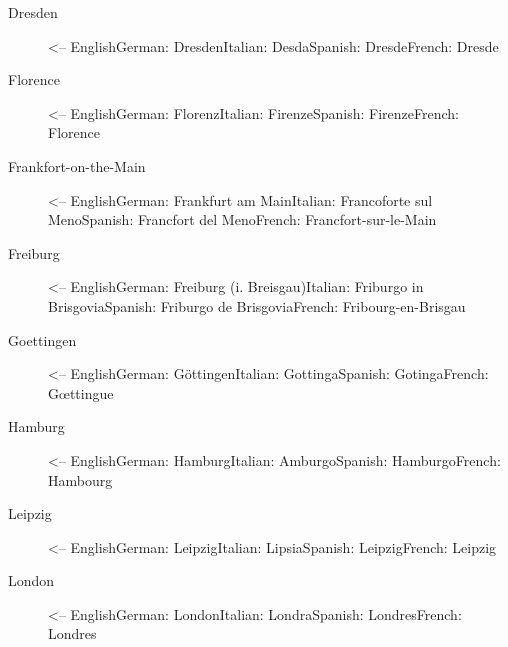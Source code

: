 \documentclass[a4paper,
10pt,
greek,
french,
spanish,
italian,
ngerman,
english
]{ltxdoc}
\begin{document}
\begin{multicols}{3}
\begin{description}
\item[Dresden] <-- English\newline German: Dresden\newline Italian: Desda\newline Spanish: Dresde\newline French: Dresde
\item[Florence] <-- English\newline German: Florenz\newline Italian: Firenze\newline Spanish: Firenze\newline French: Florence
\item[Frankfort-on-the-Main] <-- English\newline German: Frankfurt am Main\newline Italian: Francoforte sul Meno\newline Spanish: Francfort del Meno\newline French: Francfort-sur-le-Main
\item[Freiburg] <-- English\newline German: Freiburg (i. Breisgau)\newline Italian: Friburgo in Brisgovia\newline Spanish: Friburgo de Brisgovia\newline French: Fribourg-en-Brisgau
\item[Goettingen] <-- English\newline German: Göttingen\newline Italian: Gottinga\newline Spanish: Gotinga\newline French: Gœttingue
\item[Hamburg] <-- English\newline German: Hamburg\newline Italian: Amburgo\newline Spanish: Hamburgo\newline French: Hambourg
\item[Leipzig] <-- English\newline German: Leipzig\newline Italian: Lipsia\newline Spanish: Leipzig\newline French: Leipzig
\item[London] <-- English\newline German: London\newline Italian: Londra\newline Spanish: Londres\newline French: Londres

\end{description}
\end{multicols}
\end{document}
